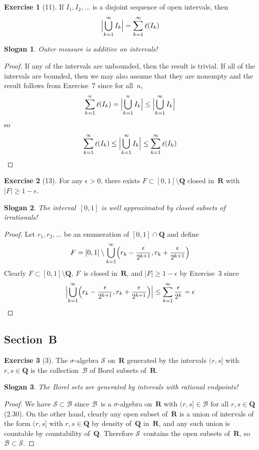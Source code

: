 \documentclass[letterpaper,12pt]{article}
\newcommand{\Q}{\mathbf{Q}}
\newcommand{\R}{\mathbf{R}}
\newcommand{\B}{\mathcal{B}}
\renewcommand{\S}{\mathcal{S}}
\newcommand{\bigunion}{\bigcup}
\newcommand{\sect}{\cap}
\DeclareMathOperator{\len}{\ell}
\renewcommand{\l}[1]{\len(#1)}
\newcommand{\m}[1]{|#1|}
\newcommand{\bigmeasure}[1]{\Bigl|#1\Bigr|}
\theoremstyle{definition}
\newtheorem*{exer}{Exercise}
\theoremstyle{remark}
\theoremstyle{plain}
\newtheorem*{slogan}{Slogan}
\begin{document}
\begin{exer}[11]
If \(I_1,I_2,\ldots\) is a disjoint sequence of open intervals, then
\[\bigmeasure{\bigunion_{k=1}^{\infty}I_k}=\sum_{k=1}^{\infty}\l{I_k}\]
\end{exer}
\begin{slogan}
Outer measure is additive on intervals!
\end{slogan}
\begin{proof}
If any of the intervals are unbounded, then the result is trivial. If all of the intervals are bounded, then we may also assume that they are nonempty and the result follows from Exercise~7 since for all~\(n\),
\[\sum_{k=1}^n\l{I_k}=\bigmeasure{\bigunion_{k=1}^n I_k}\le\bigmeasure{\bigunion_{k=1}^{\infty}I_k}\]
so
\[\sum_{k=1}^{\infty}\l{I_k}\le\bigmeasure{\bigunion_{k=1}^{\infty}I_k}\le\sum_{k=1}^{\infty}\l{I_k}\qedhere\]
\end{proof}

\begin{exer}[13]
For any \(\epsilon>0\), there exists \(F\subset[0,1]\setminus\Q\) closed in~\(\R\) with \(\m{F}\ge1-\epsilon\).
\end{exer}
\begin{slogan}
The interval~\([0,1]\) is well approximated by closed subsets of irrationals!
\end{slogan}
\begin{proof}
Let \(r_1,r_2,\ldots\) be an enumeration of \([0,1]\sect\Q\) and define
\[F=[0,1]\setminus\bigunion_{k=1}^{\infty}\Bigl(r_k-\frac{\epsilon}{2^{k+1}},r_k+\frac{\epsilon}{2^{k+1}}\Bigr)\]
Clearly \(F\subset[0,1]\setminus\Q\), \(F\)~is closed in~\(\R\), and \(\m{F}\ge1-\epsilon\) by Exercise~3 since
\[\bigmeasure{\bigunion_{k=1}^{\infty}\Bigl(r_k-\frac{\epsilon}{2^{k+1}},r_k+\frac{\epsilon}{2^{k+1}}\Bigr)}\le\sum_{k=1}^{\infty}\frac{\epsilon}{2^k}=\epsilon\qedhere\]
\end{proof}

\subsection*{Section~B}
\begin{exer}[3]
The \(\sigma\)-algebra \(\S\) on~\(\R\) generated by the intervals \((r,s]\) with \(r,s\in\Q\) is the collection~\(\B\) of Borel subsets of~\(\R\).
\end{exer}
\begin{slogan}
The Borel sets are generated by intervals with rational endpoints!
\end{slogan}
\begin{proof}
We have \(\S\subset\B\) since \(\B\)~is a \(\sigma\)-algebra on~\(\R\) with \((r,s]\in\B\) for all \(r,s\in\Q\) (2.30). On the other hand, clearly any open subset of~\(\R\) is a union of intervals of the form \((r,s]\) with \(r,s\in\Q\) by density of~\(\Q\) in~\(\R\), and any such union is countable by countability of~\(\Q\). Therefore \(\S\)~contains the open subsets of~\(\R\), so \(\B\subset\S\).
\end{proof}
\end{document}
